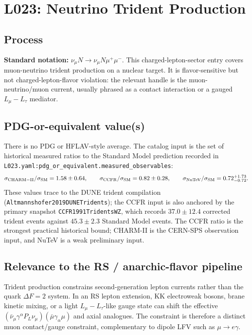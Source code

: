 
\section{L023: Neutrino Trident Production}

\subsection*{Process}
\textbf{Standard notation:} \(\nu_\mu N\to\nu_\mu N\mu^+\mu^-\).
This charged-lepton-sector entry covers muon-neutrino trident production on a
nuclear target.  It is flavor-sensitive but not charged-lepton-flavor
violation: the relevant handle is the muon-neutrino/muon current, usually
phrased as a contact interaction or a gauged \(L_\mu-L_\tau\) mediator.

\subsection*{PDG-or-equivalent value(s)}
There is no PDG or HFLAV-style average.  The catalog input is the set of
historical measured ratios to the Standard Model prediction recorded in
\texttt{L023.yaml:pdg\_or\_equivalent.measured\_observables}:
\[
  \sigma_{\rm CHARM-II}/\sigma_{\rm SM}=1.58\pm0.64,\qquad
  \sigma_{\rm CCFR}/\sigma_{\rm SM}=0.82\pm0.28,\qquad
  \sigma_{\rm NuTeV}/\sigma_{\rm SM}=0.72^{+1.73}_{-0.72}.
\]
These values trace to the DUNE trident compilation
(\texttt{Altmannshofer2019DUNETridents}); the CCFR input is also anchored by
the primary snapshot \texttt{CCFR1991TridentsWZ}, which records
\(37.0\pm12.4\) corrected trident events against \(45.3\pm2.3\) Standard
Model events.  The CCFR ratio is the strongest practical historical bound;
CHARM-II is the CERN-SPS observation input, and NuTeV is a weak preliminary
input.

\subsection*{Relevance to the RS / anarchic-flavor pipeline}
Trident production constrains second-generation lepton currents rather than the
quark \(\Delta F=2\) system.  In an RS lepton extension, KK electroweak bosons,
brane kinetic mixing, or a light \(L_\mu-L_\tau\)-like gauge state can shift the
effective \((\bar\nu_\mu\gamma^\alpha P_L\nu_\mu)(\bar\mu\gamma_\alpha\mu)\)
and axial analogues.  The constraint is therefore a distinct muon contact/gauge
constraint, complementary to dipole LFV such as \(\mu\to e\gamma\).

